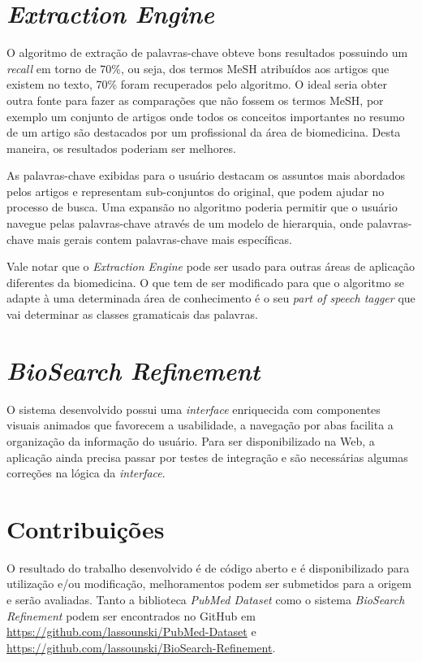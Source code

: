 \section{\emph{Extraction Engine}}

O algoritmo de extração de palavras-chave obteve bons resultados possuindo um \emph{recall} em torno de 70\%, ou seja, dos termos MeSH atribuídos aos artigos que existem no texto, 70\% foram recuperados pelo algoritmo. O ideal seria obter outra fonte para fazer as comparações que não fossem os termos MeSH, por exemplo um conjunto de artigos onde todos os conceitos importantes no resumo de um artigo são destacados por um profissional da área de biomedicina. Desta maneira, os resultados poderiam ser melhores.

As palavras-chave exibidas para o usuário destacam os assuntos mais abordados pelos artigos e representam sub-conjuntos do original, que podem ajudar no processo de busca. Uma expansão no algoritmo poderia permitir que o usuário navegue pelas palavras-chave através de um modelo de hierarquia, onde palavras-chave mais gerais contem palavras-chave mais específicas.

Vale notar que o \emph{Extraction Engine} pode ser usado para outras áreas de aplicação diferentes da biomedicina. O que tem de ser modificado para que o algoritmo se adapte à uma determinada área de conhecimento é o seu \emph{part of speech tagger} que vai determinar as classes gramaticais das palavras.

\section{\emph{BioSearch Refinement}}

O sistema desenvolvido possui uma \emph{interface} enriquecida com componentes visuais animados que favorecem a usabilidade, a navegação por abas facilita a organização da informação do usuário. Para ser disponibilizado na Web, a aplicação ainda precisa passar por testes de integração e são necessárias algumas correções na lógica da \emph{interface}.

\section{Contribuições}
O resultado do trabalho desenvolvido é de código aberto e é disponibilizado para utilização e/ou modificação, melhoramentos podem ser submetidos para a origem e serão avaliadas. Tanto a biblioteca \emph{PubMed Dataset} como o sistema \emph{BioSearch Refinement} podem ser encontrados no GitHub em \url{https://github.com/lassounski/PubMed-Dataset} e \url{https://github.com/lassounski/BioSearch-Refinement}.

